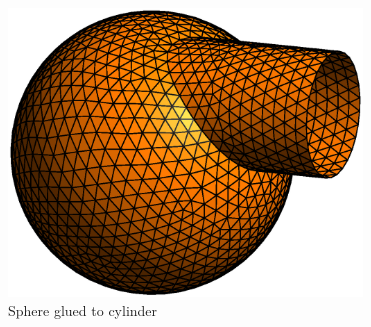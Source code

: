 \begin{figure}[ht] \centering
 \includegraphics[width=94mm]{sphere-cyl}
  \caption{Sphere glued to cylinder}
  \label{\numb section 3.\numb fig 5}
\end{figure}

